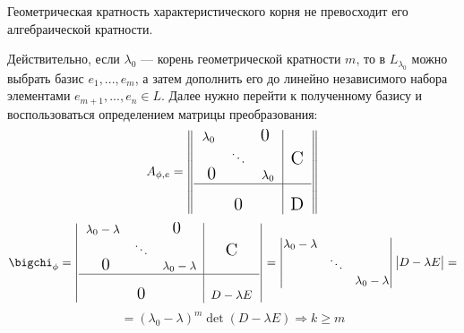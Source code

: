   \begin{thm}
  Геометрическая кратность характеристического корня не превосходит его алгебраической кратности.
  \end{thm}
  Действительно, если $\lambda_0$ --- корень геометрической кратности $m$, то в $L_{\lambda_0}$ можно выбрать базис $e_1,...,e_m$, а затем дополнить его до линейно независимого набора элементами $e_{m+1},...,e_n \in L$. Далее нужно перейти к полученному базису и воспользоваться определением матрицы преобразования:
  \begin{equation*}
  A_{\phi,e}=
  \begin{Vmatrix}
    \begin{tabular}{ccc|c}
      $\lambda_0$ & 			&$\fudge{0 }$& \\
      			& $\ddots$ 	& 			& $\fudge C$ \\
      $\fudge{ 0}$&			& $\lambda_0$ & \\ \hline
      			&  			& 			& \\
      			& $\fudge 0$ 	& 			& $\fudge D$ \\
    \end{tabular} 
  \end{Vmatrix} 
  \end{equation*}
  \begin{equation*}
  \bigchi_\phi=
  \begin{vmatrix}
    \begin{tabular}{ccc|c}
      $\lambda_0-\lambda$ & 			&$\fudge{0 }$ 			& \\
      			& $\ddots$ 	& 			& $\fudge C$ \\
      $\fudge{ 0}$&			& $\lambda_0-\lambda$ & \\ \hline
      			&  			& 			& \\
      			& $\fudge 0$ 	& 			& $ D-\lambda E$ \\
    \end{tabular} 
  \end{vmatrix} = \begin{vmatrix}
        \lambda_0-\lambda & 			& \\
      			& \ddots 	&  \\
      			&  & \lambda_0-\lambda\\ 
  \end{vmatrix} \begin{vmatrix}
  D-\lambda E
  \end{vmatrix}=
  \end{equation*}
  \begin{equation}
  =(\lambda_0-\lambda)^m \det(D-\lambda E) \Rightarrow k \ge m
  \end{equation}
